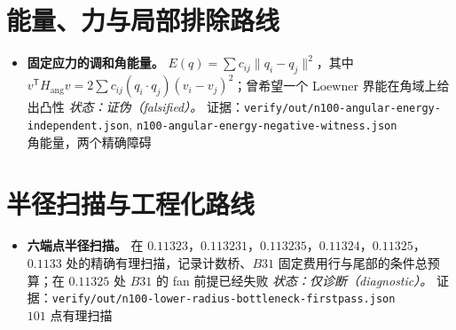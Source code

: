 \section{能量、力与局部排除路线}

\begin{itemize}[leftmargin=1.2em,itemsep=3pt]
\item \textbf{固定应力的调和角能量。} $E(q)=\sum c_{ij}\|q_i-q_j\|^2$，其中 $v^{\mathsf T}H_{\text{ang}}v=2\sum c_{ij}(q_i\cdot q_j)(v_i-v_j)^2$；曾希望一个 Loewner 界能在角域上给出凸性 \emph{状态：证伪（falsified）。} 证据：{\footnotesize\texttt{verify/\allowbreak{}out/\allowbreak{}n100-\allowbreak{}angular-\allowbreak{}energy-\allowbreak{}independent.json}}, \texttt{n100-\allowbreak{}angular-\allowbreak{}energy-\allowbreak{}negative-\allowbreak{}witness.json} \\
角能量，两个精确障碍
\end{itemize}


\section{半径扫描与工程化路线}

\begin{itemize}[leftmargin=1.2em,itemsep=3pt]
\item \textbf{六端点半径扫描。} 在 $0.11323$，$0.113231$，$0.113235$，$0.11324$，$0.11325$，$0.1133$ 处的精确有理扫描，记录计数桥、$B31$ 固定费用行与尾部的条件总预算；在 $0.11325$ 处 $B31$ 的 fan 前提已经失败 \emph{状态：仅诊断（diagnostic）。} 证据：{\footnotesize\texttt{verify/\allowbreak{}out/\allowbreak{}n100-\allowbreak{}lower-\allowbreak{}radius-\allowbreak{}bottleneck-\allowbreak{}firstpass.json}} \\
$101$ 点有理扫描
\end{itemize}
